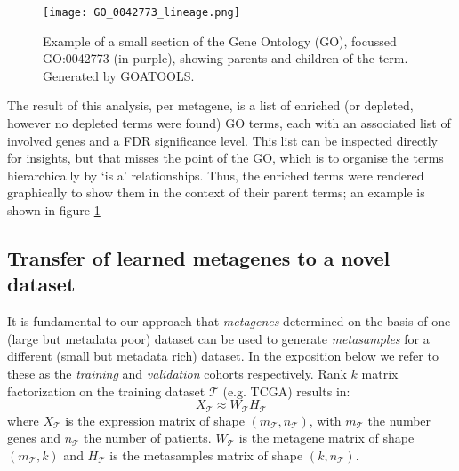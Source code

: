 \documentclass[tikz, 11pt,a4paper,oneside,fleqn]{article}
\begin{document}
\begin{figure}[htb!]
\begin{center}
\texttt{[image: GO\_0042773\_lineage.png]}
\caption{Example of a small section of the Gene Ontology (GO), focussed GO:0042773 (in purple), showing parents and children of the term.   Generated by GOATOOLS.}
\label{fig-eg_go_graphic}
\end{center}
\end{figure}

The result of this analysis, per metagene, is a list of enriched (or depleted, however no depleted terms were found) GO terms, each with an associated list of involved genes and a FDR significance level.   This list can be inspected directly for insights, but that misses the point of the GO, which is to organise the terms hierarchically by `is a' relationships.   Thus, the enriched terms were rendered graphically to show them in the context of their parent terms; an example is shown in figure \ref{fig-eg_go_graphic}


\subsection{Transfer of learned metagenes to a novel dataset}
\label{sec-transfer-to-novel}

\newcommand{\trainset}{\mathcal{T}}
\newcommand{\validset}{\mathcal{V}}

It is fundamental to our approach that \emph{metagenes} determined on the basis of one (large but metadata poor) dataset can be used to generate \emph{metasamples} for a different (small but metadata rich) dataset.   In the exposition below we refer to these as the \emph{training} and \emph{validation} cohorts respectively.
Rank $k$ matrix factorization on the training dataset $\trainset$ (e.g. TCGA) results in:
\begin{equation}
 X_\trainset \approx W_\trainset H_\trainset
\end{equation}
where $X_\trainset$ is the expression matrix of shape $(m_\trainset, n_\trainset)$, with $m_\trainset$ the number genes and $n_\trainset$ the number of patients. $W_\trainset$ is the metagene matrix of shape $(m_\trainset, k)$ and $H_\trainset$ is the metasamples matrix of shape $(k, n_\trainset)$.
\end{document}
